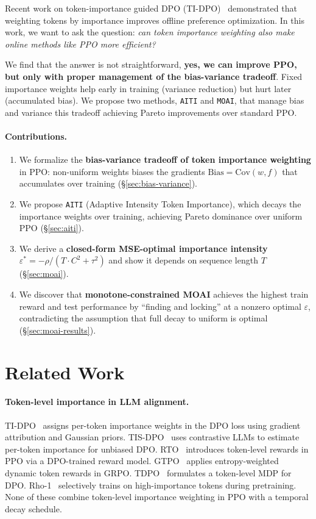 \documentclass[11pt,a4paper]{article}
\begin{document}
Recent work on token-importance guided DPO (TI-DPO)~\citep{yang2025tidpo} demonstrated that weighting tokens by importance improves offline preference optimization. In this work, we want to ask the question: \emph{can token importance weighting also make online methods like PPO more efficient?}

We find that the answer is not straightforward, \textbf{yes, we can improve PPO, but only with proper management of the bias-variance tradeoff}. Fixed importance weights help early in training (variance reduction) but hurt later (accumulated bias). We propose two methods, \texttt{AITI} and \texttt{MOAI}, that manage bias and variance this tradeoff achieving Pareto improvements over standard PPO.

\paragraph{Contributions.}
\begin{enumerate}
    \item We formalize the \textbf{bias-variance tradeoff of token importance weighting} in PPO: non-uniform weights biases the gradients $\text{Bias} = \text{Cov}(w, f)$ that accumulates over training (\S\ref{sec:bias-variance}).
    \item We propose \texttt{AITI} (Adaptive Intensity Token Importance), which decays the importance weights over training, achieving Pareto dominance over uniform PPO (\S\ref{sec:aiti}).
    \item We derive a \textbf{closed-form MSE-optimal importance intensity} $\varepsilon^* = -\rho / (T \cdot C^2 + \tau^2)$ and show it depends on sequence length $T$ (\S\ref{sec:moai}).
    \item We discover that \textbf{monotone-constrained MOAI} achieves the highest train reward and test performance by ``finding and locking'' at a nonzero optimal $\varepsilon$, contradicting the assumption that full decay to uniform is optimal (\S\ref{sec:moai-results}).
\end{enumerate}

\section{Related Work}
\label{sec:related}

\paragraph{Token-level importance in LLM alignment.}
TI-DPO~\citep{yang2025tidpo} assigns per-token importance weights in the DPO loss using gradient attribution and Gaussian priors. TIS-DPO~\citep{liu2025tisdpo} uses contrastive LLMs to estimate per-token importance for unbiased DPO. RTO~\citep{zhong2024rto} introduces token-level rewards in PPO via a DPO-trained reward model. GTPO~\citep{tan2025gtpo} applies entropy-weighted dynamic token rewards in GRPO. TDPO~\citep{zeng2024tdpo} formulates a token-level MDP for DPO. Rho-1~\citep{lin2024rho1} selectively trains on high-importance tokens during pretraining. None of these combine token-level importance weighting in PPO with a temporal decay schedule.
\end{document}
